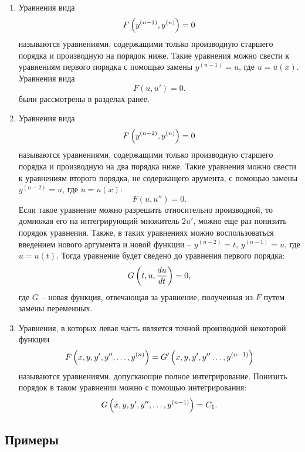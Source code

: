 \begin{enumerate}
		\item Уравнения вида
			\[ F\left( y^{(n-1)}, y^{(n)} \right) = 0 \]
			называются уравнениями, содержащими только производную старшего порядка и производную на порядок ниже. Такие уравнения можно свести к уравнениям первого порядка с помощью замены $y^{(n-1)} = u$, где $u = u(x)$. Уравнения вида 
			\[ F(u, u') = 0. \]
			были рассмотрены в разделах ранее.

		\item Уравнения вида
			\[ F\left( y^{(n-2)}, y^{(n)} \right) = 0 \]
			называются уравнениями, содержащими только производную старшего порядка и производную на два порядка ниже. Такие уравнения можно свести к уравнениям второго порядка, не содержащего арумента, с помощью замены $y^{(n-2)} = u$, где $u = u(x)$:
			\[ F(u, u'') = 0. \]
			Если такое уравнение можно разрешить относительно производной, то домножая его на интегрирующий множитель $2u'$, можно еще раз понизить порядок уравнения. Также, в таких уравнениях можно воспользоваться введением нового аргумента и новой функции -- $y^{(n-2)} = t$, $y^{(n-1)} = u$, где $u = u(t)$. Тогда уравнение будет сведено до уравнения первого порядка:
			\[ G\left( t, u, \dfrac{d u}{d t} \right) = 0, \] 
			где $G$ -- новая функция, отвечающая за уравнение, полученная из $F$ путем замены переменных.

		\item Уравнения, в которых левая часть является точной производной некоторой функции
			\[ F\left( x, y, y', y'', \dots, y^{(n)} \right) = G'\left( x, y, y', y'' \dots, y^{(n-1)} \right) \]
			называются уравнениями, допускающие полное интегрирование. Понизить порядок в таком уравнении можно с помощью интегрирования:
			\[ G\left( x, y, y', y'', \dots, y^{(n-1)} \right) = C_1. \]

	\end{enumerate}

	\subsection{Примеры}

